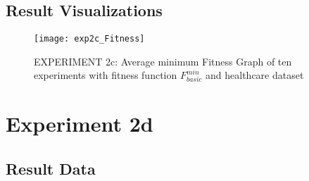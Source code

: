 	\subsection{Result Visualizations}
	\label{sec:A_Exp2c_Diagrams}
		\begin{figure}[H]
	    	\centering
	    	\texttt{[image: exp2c\_Fitness]}
	    	\caption{EXPERIMENT 2c: Average minimum Fitness Graph of ten experiments with fitness function $F_{basic}^{min}$ and healthcare dataset}
	    	\label{fig:exp2c_Fitness}
		\end{figure}

\section{Experiment 2d}
\label{sec:A_Exp2d}
	\subsection{Result Data}
	\label{sec:A_Exp2d_Data}

